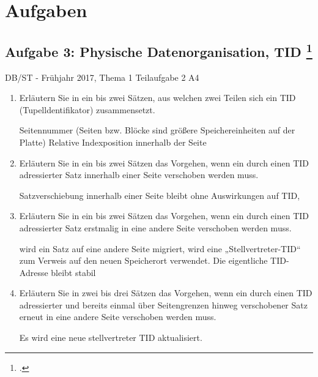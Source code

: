 \documentclass{lehramt-informatik}
\begin{document}

\chapter{Aufgaben}

\section{Aufgabe 3: Physische Datenorganisation, TID
\footcite{db:pu:3}}

DB/ST - Frühjahr 2017, Thema 1 Teilaufgabe 2 A4

\begin{enumerate}
\item Erläutern Sie in ein bis zwei Sätzen, aus welchen zwei Teilen
sich ein TID (Tupelldentifikator) zusammensetzt.

\begin{antwort}
Seitennummer (Seiten bzw. Blöcke sind größere Speichereinheiten auf der
Platte) Relative Indexposition innerhalb der Seite
\end{antwort}

\item Erläutern Sie in ein bis zwei Sätzen das Vorgehen, wenn ein
durch einen TID adressierter Satz innerhalb einer Seite verschoben
werden muss.

\begin{antwort}
Satzverschiebung innerhalb einer Seite bleibt ohne Auswirkungen auf TID,
\end{antwort}

\item Erläutern Sie in ein bis zwei Sätzen das Vorgehen, wenn ein
durch einen TID adressierter Satz erstmalig in eine andere Seite
verschoben werden muss.

\begin{antwort}
wird ein Satz auf eine andere Seite migriert, wird eine
„Stellvertreter-TID“ zum Verweis auf den neuen Speicherort verwendet.
Die eigentliche TID-Adresse bleibt stabil
\end{antwort}

\item Erläutern Sie in zwei bis drei Sätzen das Vorgehen, wenn ein
durch einen TID adressierter und bereits einmal über Seitengrenzen
hinweg verschobener Satz erneut in eine andere Seite verschoben werden
muss.

\begin{antwort}
Es wird eine neue stellvertreter TID aktualisiert.
\end{antwort}

\end{enumerate}

\literatur
\end{document}
